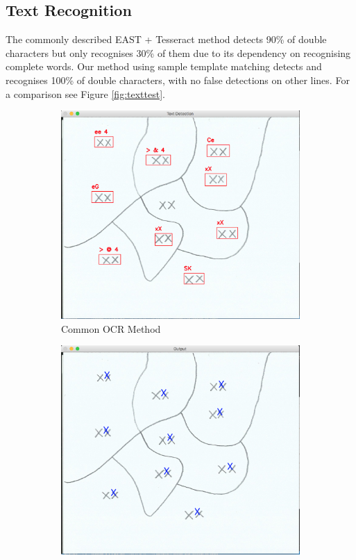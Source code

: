 \documentclass[11pt]{IEEEtran}
\begin{document}
\subsection{Text Recognition}

The commonly described EAST + Tesseract method detects 90\% of double characters but only recognises 30\% of them due to its dependency on recognising complete words. Our method using sample template matching detects and recognises 100\% of double characters, with no false detections on other lines. For a comparison see Figure \ref{fig:texttest}.

\begin{figure}[h]
     \centering
     \begin{subfigure}[b]{0.4\textwidth}
         \centering
         \includegraphics[width=\textwidth]{ocrprior}
         \caption{Common OCR Method}
         \label{fig:ocrprior}
     \end{subfigure}
     \hfill
     \begin{subfigure}[b]{0.4\textwidth}
         \centering
         \includegraphics[width=\textwidth]{textrec}

\end{subfigure}
\end{figure}
\end{document}
